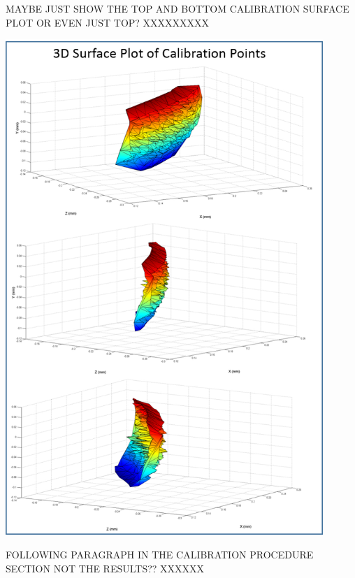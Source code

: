 \documentclass[11pt]{article}
\begin{document}
MAYBE JUST SHOW THE TOP AND BOTTOM CALIBRATION SURFACE PLOT OR EVEN JUST TOP? XXXXXXXXX


\begin{center}
\includegraphics[width=0.9\textwidth]{images/surfacePlotTogether.png}
\label{figure:surfacePlot}
\end{center}


FOLLOWING PARAGRAPH IN THE CALIBRATION PROCEDURE SECTION NOT THE RESULTS?? XXXXXX
\end{document}
